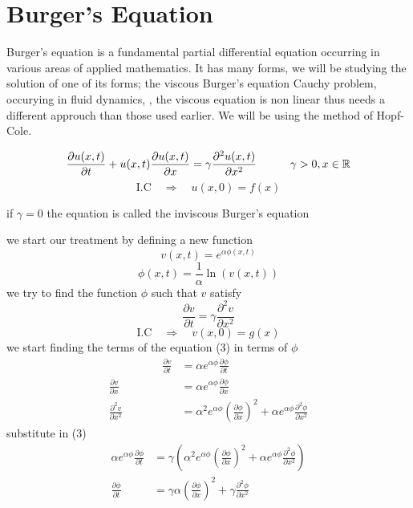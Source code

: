 \documentclass[]{article}
\begin{document}
\newpage
\setcounter{equation}{0}
\section{Burger's Equation}

Burger's equation  is a fundamental partial differential equation occurring in various areas of applied mathematics. It has many forms, we will be studying the solution of one of its forms; the viscous Burger's equation Cauchy problem, occurying in fluid dynamics, , the viscous equation is non linear thus needs a different approuch than those used earlier. We will be using the method of Hopf-Cole.

\begin{equation}
\frac{\partial u(x,t)}{\partial t} + u(x,t)\frac{\partial u(x,t)}{\partial x} = \gamma \frac{\partial^2 u(x,t)}{\partial x^2} \quad\quad\quad \gamma > 0 , x \in \mathbb{R}
\end{equation}
\begin{equation}
\text{I.C} \quad \Longrightarrow \quad u(x,0) = f(x)
\end{equation}
\begin{enrichment*}{}
    if $\gamma = 0$ the equation is called the inviscous Burger's equation
\end{enrichment*}
we start our treatment by defining a new function
\[
v(x,t) = e^{\alpha\phi(x,t)}    
\]
\[
\phi(x,t) = \frac{1}{\alpha}\ln(v(x,t))    
\]
we try to find the function $\phi$ such that $v$ satisfy
\begin{equation}
\frac{\partial v}{\partial t} = \gamma \frac{\partial^2 v}{\partial x^2}
\end{equation}
\begin{equation*}
\text{I.C} \quad \Longrightarrow \quad v(x,0) = g(x)
\end{equation*}
we start finding the terms of the equation (3) in terms of $\phi$
\begin{align*}
\hspace{2cm}
\frac{\partial v}{\partial t} &= \alpha e^{\alpha\phi} \frac{\partial \phi}{\partial t}
\\
\frac{\partial v}{\partial x} &= \alpha e^{\alpha\phi} \frac{\partial \phi}{\partial x} 
\\
\frac{\partial^2 v}{\partial x^2} &= \alpha^2 e^{\alpha \phi} {\left(\frac{\partial \phi}{\partial x}\right)}^2 + \alpha e^{\alpha\phi} \frac{\partial^2 \phi}{\partial x^2}
\end{align*}
substitute in (3)
\begin{align}
\alpha e^{\alpha\phi} \frac{\partial \phi}{\partial t} &= \gamma\left(\alpha^2 e^{\alpha \phi} {\left(\frac{\partial \phi}{\partial x}\right)}^2 + \alpha e^{\alpha\phi} \frac{\partial^2 \phi}{\partial x^2}\right)\nonumber
\\
\frac{\partial \phi}{\partial t} &= \gamma\alpha {\left(\frac{\partial \phi}{\partial x}\right)}^2 + \gamma \frac{\partial^2 \phi}{\partial x^2}
\end{align}
\end{document}

